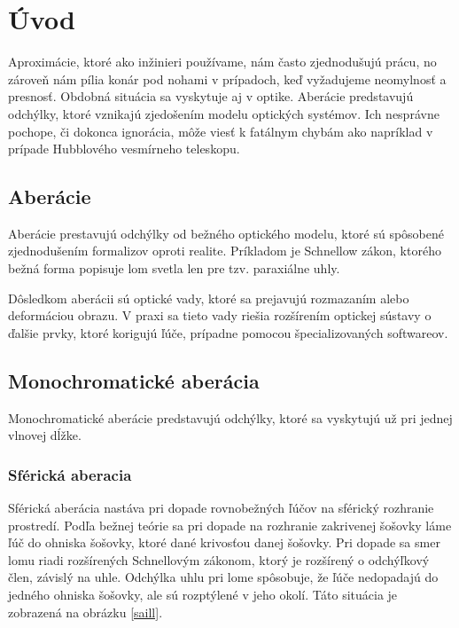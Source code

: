 \chapter{Úvod}
Aproximácie, ktoré ako inžinieri používame, nám často zjednodušujú prácu, no zároveň nám pília konár
pod nohami v prípadoch, keď vyžadujeme neomylnosť a presnosť.
Obdobná situácia sa vyskytuje aj v optike. Aberácie predstavujú odchýlky, ktoré vznikajú zjedošením
modelu optických systémov. Ich nesprávne pochope, či dokonca ignorácia, môže viesť k fatálnym chybám
ako napríklad v prípade Hubblového vesmírneho teleskopu.

\section{Aberácie}
Aberácie prestavujú odchýlky od bežného optického modelu, ktoré sú spôsobené zjednodušením
formalizov oproti realite. Príkladom je Schnellow zákon, ktorého bežná forma popisuje lom svetla len
pre tzv. paraxiálne uhly. \cite{hechtoptics}

Dôsledkom aberácii sú optické vady, ktoré sa prejavujú rozmazaním alebo deformáciou obrazu. V praxi sa tieto
vady riešia rozšírením optickej sústavy o ďalšie prvky, ktoré korigujú ľúče, prípadne pomocou
špecializovaných softwareov.

\section{Monochromatické aberácia}
Monochromatické aberácie predstavujú odchýlky, ktoré sa vyskytujú už pri jednej vlnovej dĺžke.
\subsection{Sférická aberacia}
Sférická aberácia nastáva pri dopade rovnobežných ľúčov na sférický rozhranie prostredí. 
Podľa bežnej teórie sa pri dopade na rozhranie zakrivenej šošovky láme ľúč do ohniska šošovky, ktoré
dané krivosťou danej šošovky. 
Pri dopade sa smer lomu riadi rozšírených Schnellovým zákonom, ktorý je rozšírený o odchýľkový člen, závislý na
uhle. Odchýlka uhlu pri lome spôsobuje, že ľúče nedopadajú do jedného ohniska šošovky, ale sú
rozptýlené v jeho okolí. Táto situácia
je zobrazená na obrázku \ref{saill}.

